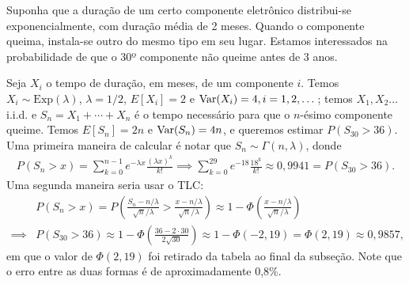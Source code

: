 \documentclass[../Notas.tex]{subfiles}
\begin{document}
\begin{example}
Suponha que a duração de um certo componente eletrônico distribui-se exponencialmente, com duração média de 2 meses. Quando o componente queima, instala-se outro do mesmo tipo em seu lugar. Estamos interessados na probabilidade de que o 30º componente não queime antes de 3 anos.

Seja $X_i$ o tempo de duração, em meses, de um componente $i$. Temos $X_i\sim\text{Exp}(\lambda)$, $\lambda = 1/2$, $E[X_i] = 2$ e $\text{Var}(X_i) = 4, i = 1, 2, \dots$; temos $X_1, X_2 \dots$ i.i.d. e $S_n = X_1 + \cdots + X_n$ é o tempo necessário para que o $n$-ésimo componente queime. Temos $E[S_n] = 2n$ e $\text{Var}(S_n) = 4n$, e queremos estimar $P(S_{30} > 36)$. Uma primeira maneira de calcular é notar que $S_n\sim\Gamma(n, \lambda)$, donde
\begin{align*}
    P(S_n > x) = \sum_{k=0}^{n-1} e^{-\lambda x}\frac{(\lambda x)^k}{k!} \implies \sum_{k=0}^{29}e^{-18}\frac{18^k}{k!} \approx 0,9941 = P(S_{30} > 36).
\end{align*}
Uma segunda maneira seria usar o TLC:
\begin{align*}
    &P(S_n > x) = P\left( \frac{S_n - n/\lambda}{\sqrt{n}/\lambda} > \frac{x - n/\lambda}{\sqrt{n}/\lambda} \right) \approx 1 - \Phi\left( \frac{x - n/\lambda}{\sqrt{n}/\lambda} \right) \\
    \implies &P(S_{30} > 36) \approx 1 - \Phi\left( \frac{36 - 2\cdot 30}{2\sqrt{30}} \right) \approx 1 - \Phi(-2,19) = \Phi(2,19) \approx 0,9857,
\end{align*}
em que o valor de $\Phi(2,19)$ foi retirado da tabela ao final da subseção. Note que o erro entre as duas formas é de aproximadamente 0,8\%.
\end{example}
\end{document}
